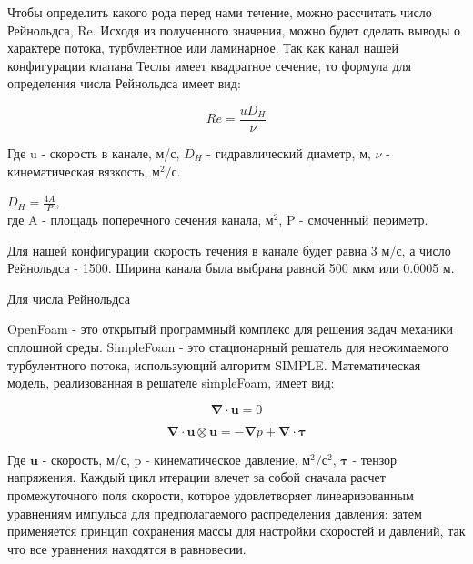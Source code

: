 \documentclass[14pt,a4paper]{article}
\begin{document}
        Чтобы определить какого рода перед нами течение, можно рассчитать число Рейнольдса, Re. Исходя из полученного значения, можно будет сделать выводы о характере потока, турбулентное или ламинарное.
        Так как канал нашей конфигурации клапана Теслы имеет квадратное сечение, то формула для определения числа Рейнольдса имеет вид:
        
        \begin{equation}\label{eqn:Re}
            Re = \frac{u D_{H}}{\nu}
        \end{equation}
            
        Где  u - скорость в канале, м/с, $ D_{H} $ - гидравлический диаметр, м, $\nu$ - кинематическая вязкость, м$^{2}/$с. 
        
        $D_{H} = \frac{4A}{P}$,\\
        где A - площадь поперечного сечения канала, м$^{2}$, P - смоченный периметр. 
        
        Для нашей конфигурации скорость течения в канале будет равна 3 м/с, а число Рейнольдса - 1500. Ширина канала была выбрана равной 500 мкм или 0.0005 м.  
        
        Для числа Рейнольдса    
        
        OpenFoam - это открытый программный комплекс для решения задач механики сплошной среды. SimpleFoam - это стационарный решатель для несжимаемого турбулентного потока, использующий алгоритм SIMPLE. Математическая модель, реализованная в решателе simpleFoam, имеет вид:
        
        \begin{equation}\label{eqn:simpleFoam}
            \bm{\nabla} \cdot \bm{u} = 0
        \end{equation} 
        
        \begin{equation}\label{eqn:simpleFoam2}
            \bm{\nabla} \cdot \bm{u} \otimes \bm{u} = -\bm{\nabla} p + \bm{\nabla} \cdot \bm{\tau}
        \end{equation} 
        
        Где $\bm{u}$ - скорость, м/с, p - кинематическое давление, м$^{2}/$с$^{2}$, $\bm{\tau}$ - тензор напряжения. 
        Каждый цикл итерации влечет за собой сначала расчет промежуточного поля скорости, которое удовлетворяет линеаризованным уравнениям импульса для предполагаемого распределения давления: затем применяется принцип сохранения массы для настройки скоростей и давлений, так что все уравнения находятся в равновесии.
        
\end{document}
